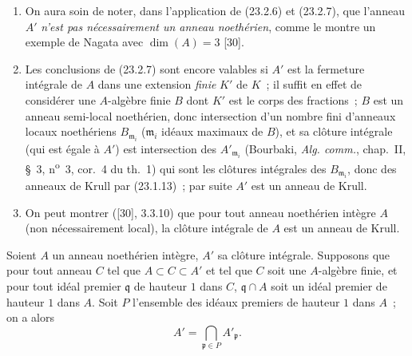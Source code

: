\begin{remarks}[23.2.8]
\label{0.23.2.8-fr}
\begin{enumerate}
  \item[(i)] On aura soin de noter, dans l'application de (23.2.6) et
  (23.2.7), que l'anneau $A'$ \emph{n'est pas nécessairement un anneau
  noethérien}, comme le montre un exemple de Nagata avec $\dim(A)=3$ [30].

  \item[(ii)] Les conclusions de (23.2.7) sont encore valables si $A'$ est
  la fermeture intégrale de $A$ dans une extension \emph{finie} $K'$ de $K$~; il
  suffit en effet de considérer une $A$-algèbre finie $B$ dont $K'$ est le
  corps des fractions~; $B$ est un anneau semi-local noethérien, donc
  intersection d'un nombre fini d'anneaux locaux noethériens
  $B_{\mathfrak m_i}$ ($\mathfrak m_i$ idéaux maximaux de $B$), et sa clôture
  intégrale (qui est égale à $A'$) est intersection des
  $A'_{\mathfrak m_i}$ (Bourbaki, \emph{Alg. comm.}, chap.~II, §~3,
  n\textsuperscript{o}~3, cor.~4 du th.~1) qui sont les clôtures intégrales
  des $B_{\mathfrak m_i}$, donc des anneaux de Krull par (23.1.13)~; par
  suite $A'$ est un anneau de Krull.

  \item[(iii)] On peut montrer ([30], 3.3.10) que pour tout anneau noethérien
  intègre $A$ (non nécessairement local), la clôture intégrale de $A$ est un
  anneau de Krull.
\end{enumerate}
\end{remarks}

\begin{corollary}[23.2.9]
\label{0.23.2.9-fr}
Soient $A$ un anneau noethérien intègre, $A'$ sa clôture intégrale. Supposons
que pour tout anneau $C$ tel que $A\subset C\subset A'$ et tel que $C$ soit
une $A$-algèbre finie, et pour tout idéal premier $\mathfrak q$ de hauteur $1$
dans $C$, $\mathfrak q\cap A$ soit un idéal premier de hauteur $1$ dans $A$.
Soit $P$ l'ensemble des idéaux premiers de hauteur $1$ dans $A$~; on a alors
\[
  A'=\bigcap_{\mathfrak p\in P}A'_{\mathfrak p}.
\]
\end{corollary}

